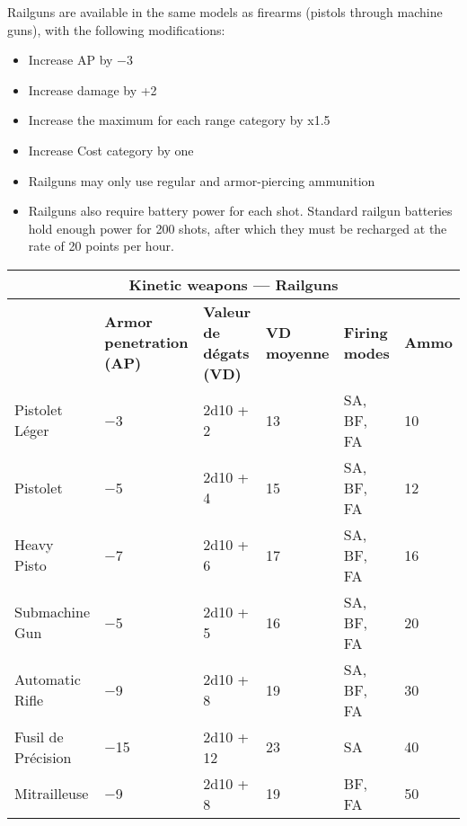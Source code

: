 Railguns are available in the same models as firearms (pistols through machine guns), with the following modifications: 

\begin{itemize} \item Increase AP by $-$3 \item Increase damage by +2 \item Increase the maximum for each range category by x1.5 \item Increase Cost category by one \item Railguns may only use regular and armor-piercing ammunition \item Railguns also require battery power for each shot. Standard railgun batteries hold enough power for 200 shots, after which they must be recharged at the rate of 20 points per hour. \end{itemize} 

\begin{table} \begin{tabularx}{\textwidth}{|l|X|X|X|X|l|} \hline

\multicolumn{6}{|c|}{\textbf{Kinetic weapons --- Railguns}} \\ \hline

&\textbf{Armor penetration (AP)}	&\textbf{Valeur de dégats (VD)}	&\textbf{VD moyenne}	&\textbf{Firing modes}	&\textbf{Ammo} \\ \hline

Pistolet Léger	&$-$3	&2d10 + 2	&13	&SA, BF, FA	&10 \\ \hline

Pistolet	&$-$5	&2d10 + 4	&15	&SA, BF, FA	&12 \\ \hline

Heavy Pisto	&$-$7	&2d10 + 6	&17	&SA, BF, FA	&16 \\ \hline

Submachine Gun &$-$5	&2d10 + 5	&16	&SA, BF, FA	&20 \\ \hline

Automatic Rifle	&$-$9	&2d10 + 8	&19	&SA, BF, FA	&30 \\ \hline

Fusil de Précision	&$-$15	&2d10 + 12	&23	&SA	&40 \\ \hline

Mitrailleuse	&$-$9	&2d10 + 8	&19	&BF, FA	&50 \\ \hline

\end{tabularx} \label{tab:kinetic-railguns} \end{table} 

